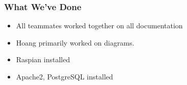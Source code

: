 \begin{frame}
    \frametitle{What We've Done}
    \begin{itemize}
        \item All teammates worked together on all documentation
        \item Hoang primarily worked on diagrams.
        \item Raspian installed
        \item Apache2, PostgreSQL installed
    \end{itemize}
\end{frame}

